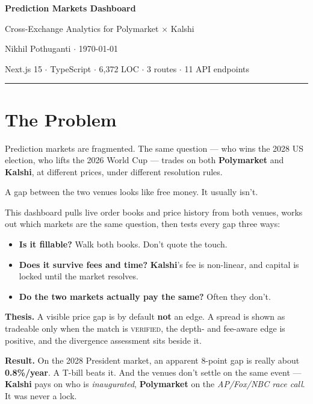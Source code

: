 \documentclass[11pt,a4paper]{article}
\newcommand{\PM}{{\color{poly}\textbf{Polymarket}}}
\newcommand{\KS}{{\color{kalshi}\textbf{Kalshi}}}
\begin{document}
\begin{center}
{\LARGE\bfseries\color{ink} Prediction Markets Dashboard\par}
\vspace{0.35em}
{\large\color{slate} Cross-Exchange Analytics for \textcolor{poly}{Polymarket} $\times$ \textcolor{kalshi}{Kalshi}\par}
\vspace{0.7em}
{\normalsize Nikhil Pothuganti \;$\cdot$\; \today\par}
\vspace{0.35em}
{\small\color{slate} Next.js 15 $\cdot$ TypeScript $\cdot$ 6{,}372 LOC $\cdot$ 3 routes $\cdot$ 11 API endpoints\par}
\vspace{0.5em}
\textcolor{rule}{\rule{0.9\textwidth}{0.8pt}}
\end{center}

\section{The Problem}

Prediction markets are fragmented. The same question --- who wins the 2028 US election, who
lifts the 2026 World Cup --- trades on both \PM{} and \KS{}, at different prices, under
different resolution rules.

A gap between the two venues looks like free money. It usually isn't.

This dashboard pulls live order books and price history from both venues, works out which
markets are the same question, then tests every gap three ways:

\begin{itemize}
  \item \textbf{Is it fillable?} Walk both books. Don't quote the touch.
  \item \textbf{Does it survive fees and time?} \KS{}'s fee is non-linear, and capital is
        locked until the market resolves.
  \item \textbf{Do the two markets actually pay the same?} Often they don't.
\end{itemize}

\begin{keybox}
\textbf{Thesis.} A visible price gap is by default \textbf{not} an edge. A spread is shown as
tradeable only when the match is \textsc{verified}, the depth- and fee-aware edge is positive,
and the divergence assessment sits beside it.

\smallskip
\textbf{Result.} On the 2028 President market, an apparent 8-point gap is really about
\textbf{0.8\%/year}. A T-bill beats it. And the venues don't settle on the same event --- \KS{}
pays on who is \emph{inaugurated}, \PM{} on the \emph{AP/Fox/NBC race call}. It was never a
lock.
\end{keybox}
\end{document}
